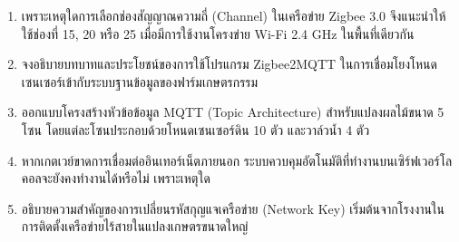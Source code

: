 \begin{enumerate}
    \item เพราะเหตุใดการเลือกช่องสัญญาณความถี่ (Channel) ในเครือข่าย Zigbee 3.0 จึงแนะนำให้ใช้ช่องที่ 15, 20 หรือ 25 เมื่อมีการใช้งานโครงข่าย Wi-Fi 2.4 GHz ในพื้นที่เดียวกัน
    \item จงอธิบายบทบาทและประโยชน์ของการใช้โปรแกรม Zigbee2MQTT ในการเชื่อมโยงโหนดเซนเซอร์เข้ากับระบบฐานข้อมูลของฟาร์มเกษตรกรรม
    \item ออกแบบโครงสร้างหัวข้อข้อมูล MQTT (Topic Architecture) สำหรับแปลงผลไม้ขนาด 5 โซน โดยแต่ละโซนประกอบด้วยโหนดเซนเซอร์ดิน 10 ตัว และวาล์วน้ำ 4 ตัว
    \item หากเกตเวย์ขาดการเชื่อมต่ออินเทอร์เน็ตภายนอก ระบบควบคุมอัตโนมัติที่ทำงานบนเซิร์ฟเวอร์โลคอลจะยังคงทำงานได้หรือไม่ เพราะเหตุใด
    \item อธิบายความสำคัญของการเปลี่ยนรหัสกุญแจเครือข่าย (Network Key) เริ่มต้นจากโรงงานในการติดตั้งเครือข่ายไร้สายในแปลงเกษตรขนาดใหญ่
\end{enumerate}

\clearpage
